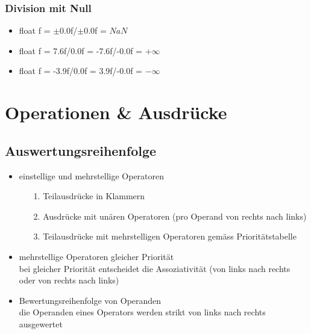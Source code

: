 \documentclass[a4paper,10pt]{article}
\begin{document}
\subsubsection{Division mit Null}
\begin{itemize}
	\item float f = $\pm$0.0f/$\pm$0.0f = $NaN$
	\item float f = 7.6f/0.0f = -7.6f/-0.0f = $+\infty$
	\item float f = -3.9f/0.0f = 3.9f/-0.0f = $-\infty$
\end{itemize}

\newpage
\section{Operationen \& Ausdr\"ucke}

\subsection{Auswertungsreihenfolge}
\begin{itemize}
	\item einstellige und mehrstellige Operatoren
		\begin{itemize}
			\item[1.] Teilausdr\"ucke in Klammern
			\item[2.] Ausdr\"ucke mit un\"aren Operatoren (pro Operand von rechts nach links)
			\item[3.] Teilausdr\"ucke mit mehrstelligen Operatoren gem\"ass Priorit\"atstabelle
		\end{itemize}
	\item mehrstellige Operatoren gleicher Priorit\"at \\
		bei gleicher Priorit\"at entscheidet die Assoziativit\"at (von links nach rechts oder von rechts nach links)
	\item Bewertungsreihenfolge von Operanden \\
		die Operanden eines Operators werden strikt von links nach rechts ausgewertet
\end{itemize}
\end{document}
